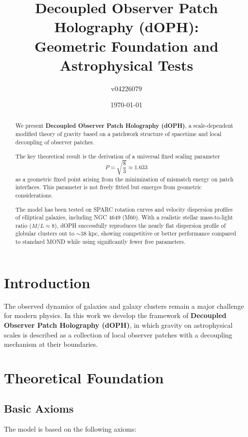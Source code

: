 \documentclass[12pt,a4paper]{article}
\title{Decoupled Observer Patch Holography (dOPH): \\
Geometric Foundation and Astrophysical Tests}
\author{v04226079}
\date{\today}
\begin{document}
\maketitle

\begin{abstract}
We present \textbf{Decoupled Observer Patch Holography (dOPH)}, a scale-dependent modified theory of gravity based on a patchwork structure of spacetime and local decoupling of observer patches.

The key theoretical result is the derivation of a universal fixed scaling parameter 
\[
P = \sqrt{\frac{8}{3}} \approx 1.633
\]
as a geometric fixed point arising from the minimization of mismatch energy on patch interfaces. This parameter is not freely fitted but emerges from geometric considerations.

The model has been tested on SPARC rotation curves and velocity dispersion profiles of elliptical galaxies, including NGC 4649 (M60). With a realistic stellar mass-to-light ratio ($M/L \approx 8$), dOPH successfully reproduces the nearly flat dispersion profile of globular clusters out to $\sim 38$ kpc, showing competitive or better performance compared to standard MOND while using significantly fewer free parameters.
\end{abstract}

\section{Introduction}

The observed dynamics of galaxies and galaxy clusters remain a major challenge for modern physics. In this work we develop the framework of \textbf{Decoupled Observer Patch Holography (dOPH)}, in which gravity on astrophysical scales is described as a collection of local observer patches with a decoupling mechanism at their boundaries.

\section{Theoretical Foundation}

\subsection{Basic Axioms}

The model is based on the following axioms:
\end{document}
